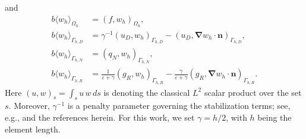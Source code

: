 \documentclass{article}
\begin{document}
and
\begin{subequations}
\begin{align} 
    b\langle w_h \rangle_{\Omega_h} &= (f,w_h)_{\Omega_h},  \\
    b\langle w_h \rangle_{\Gamma_{h,D}} &= \gamma^{-1} (u_D,w_h)_{\Gamma_{h,D}} 
    -(u_D,\boldsymbol{\nabla} w_h \cdot \boldsymbol{n})_{\Gamma_{h,D}} ,  \\
    b \langle w_h \rangle_{\Gamma_{h,N}} &= (q_N,w_h)_{\Gamma_{h,N}},  \\
    b\langle w_h \rangle_{\Gamma_{h,R}} &=  \frac{1}{\varepsilon + \gamma} (g_{R},w_h)_{\Gamma_{h,R}} - \frac{\gamma}{\varepsilon + \gamma} (g_{R},\boldsymbol{\nabla} w_h \cdot \boldsymbol{n})_{\Gamma_{h,R}}. 
\end{align}
\end{subequations}
Here $(u,w)_{s}  =\int_{s} u\,w\, ds$ is denoting the classical $L^2$ scalar product over the set $s$. Moreover, $\gamma^{-1}$ is a penalty parameter governing the stabilization terms; see, e.g., \cite{juntunen2009nitsche, benzaken2024constructing} and the references herein. For this work, we set $\gamma = h/2$, with $h$ being the element length.
\end{document}
